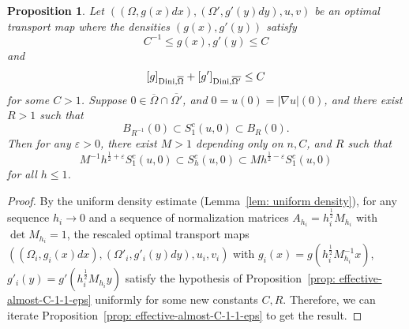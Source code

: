 \documentclass[12pt,reqno]{amsart}
\newtheorem{prop}{Proposition}[section]
\newcommand{\eps}{\varepsilon}
\numberwithin{equation}{section}
\begin{document}
        \begin{prop}\label{prop: effective-C-1-1-eps}
            Let $((\Omega, g(x)dx), (\Omega', g'(y)dy), u, v)$ be an optimal transport map where the densities $(g(x), g'(y))$ satisfy
	    \[C^{-1}\leq g(x), g'(y)\leq C\]
    	   and
	    \[[g]_{{\rm Dini}, \overline{\Omega}}+[g']_{{\rm Dini}, \overline{\Omega'}}\leq C\]
            for some $C>1$. Suppose $0\in\overline\Omega\cap\overline{\Omega'}$, and $0 = u(0) = |\nabla u|(0)$, and there exist $R>1$ such that 
            \begin{equation}
                B_{R^{-1}}(0)\subset S^c_1(u, 0)\subset B_{R}(0). 
            \end{equation}
            Then for any $\eps>0$, there exist $M>1$ depending only on $n, C$, and $R$ such that
            \[M^{-1}h^{\frac 1 2+\eps}S_1^c(u, 0)\subset S^c_h(u, 0)\subset Mh^{\frac 1 2 -\eps}S_1^c(u, 0)\]
            for all $h\leq 1$. 
        \end{prop}
        \begin{proof}
            By the uniform density estimate (Lemma~\ref{lem: uniform density}), for any sequence $h_i\to 0$ and a sequence of normalization matrices $A_{h_i} = h_i^{\frac 1 2}M_{h_i}$ with $\det M_{h_i} = 1$, the rescaled optimal transport maps $((\Omega_i, g_i(x)dx), (\Omega'_i, g'_i(y)dy), u_i, v_i)$ with $g_i(x) = g(h_i^{\frac 1 2}M_{h_i}^{-1}x)$, $g'_i(y) = g'(h_i^{\frac 1 2}M_{h_i}y)$ satisfy the hypothesis of Proposition~\ref{prop: effective-almost-C-1-1-eps} uniformly for some new constants $C, R$. Therefore, we can iterate Proposition~\ref{prop: effective-almost-C-1-1-eps} to get the result. 
        \end{proof}
        
\end{document}
